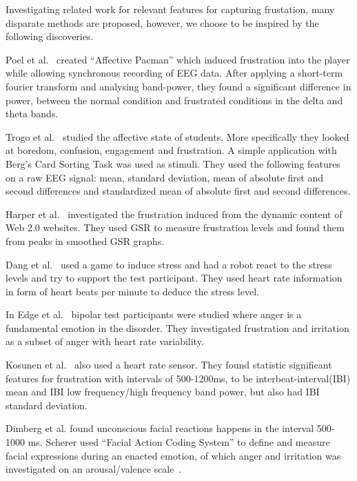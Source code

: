 Investigating related work for relevant features for capturing frustation, many disparate methods are proposed, however,
we choose to be inspired by the following discoveries.

Poel et al.~\cite{affective_pacman} created ``Affective Pacman'' which induced frustration into the player while allowing synchronous recording of EEG data. After applying a short-term fourier transform and analysing band-power, they found a significant difference in power, between the normal condition and frustrated conditions in the delta and theta bands.

Trogo et al.~\cite{brainwave_signals_frustration} studied the affective state of students. More specifically they looked at boredom, confusion, engagement and frustration. 
A simple application with Berg's Card Sorting Task\cite{bergs_card_sorting} was used as stimuli.
They used the following features on a raw EEG signal: mean, standard deviation, mean of absolute first and second differences and standardized mean of absolute first and second differences.

Harper et al.~\cite{web20_frustration} investigated the frustration induced from the dynamic content of Web 2.0 websites. 
They used GSR to measure frustration levels and found them from peaks in smoothed GSR graphs.

Dang et al.~\cite{stress_robot} used a game to induce stress and had a robot react to the stress levels and try to support the test participant. 
They used heart rate information in form of heart beats per minute to deduce the stress level.

In Edge et al.~\cite{bipolar_frustration} bipolar test participants were studied where anger is a fundamental emotion in the disorder. 
They investigated frustration and irritation as a subset of anger with heart rate variability.

Kosunen et al.~\cite{boredom_negative_mood_features} also used a heart rate sensor.
They found statistic significant features for frustration with intervals of 500-1200ms, to be interbeat-interval(IBI) mean and IBI low frequency/high frequency band power, but also had IBI standard deviation.

Dimberg et al. \cite{face_onset} found unconscious facial reactions happens in the interval 500-1000 ms.
Scherer used ``Facial Action Coding System'' to define and measure facial expressions during an enacted emotion, of which anger and irritation was investigated on an arousal/valence scale~\cite{scherer_kinect}.


